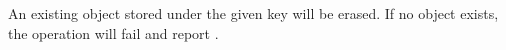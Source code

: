 \item An existing object stored under the given key will be erased.  If no
    object exists, the operation will fail and report .
